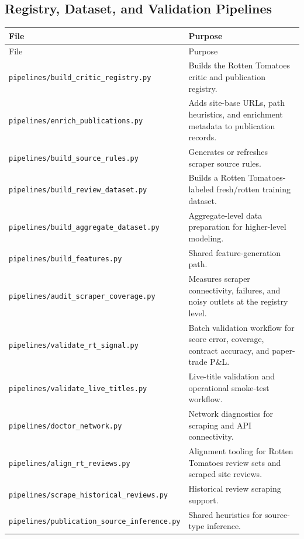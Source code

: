 \documentclass[11pt]{article}
\begin{document}
\subsection{Registry, Dataset, and Validation Pipelines}
\begin{longtable}{>{\ttfamily}p{}p{}}
\toprule
File & Purpose \\
\midrule
\endfirsthead
\toprule
File & Purpose \\
\midrule
\endhead
\textnormal{\texttt{pipelines/build\_critic\_registry.py}} & Builds the Rotten Tomatoes critic and publication registry. \\
\textnormal{\texttt{pipelines/enrich\_publications.py}} & Adds site-base URLs, path heuristics, and enrichment metadata to publication records. \\
\textnormal{\texttt{pipelines/build\_source\_rules.py}} & Generates or refreshes scraper source rules. \\
\textnormal{\texttt{pipelines/build\_review\_dataset.py}} & Builds a Rotten Tomatoes-labeled fresh/rotten training dataset. \\
\textnormal{\texttt{pipelines/build\_aggregate\_dataset.py}} & Aggregate-level data preparation for higher-level modeling. \\
\textnormal{\texttt{pipelines/build\_features.py}} & Shared feature-generation path. \\
\textnormal{\texttt{pipelines/audit\_scraper\_coverage.py}} & Measures scraper connectivity, failures, and noisy outlets at the registry level. \\
\textnormal{\texttt{pipelines/validate\_rt\_signal.py}} & Batch validation workflow for score error, coverage, contract accuracy, and paper-trade P\&L. \\
\textnormal{\texttt{pipelines/validate\_live\_titles.py}} & Live-title validation and operational smoke-test workflow. \\
\textnormal{\texttt{pipelines/doctor\_network.py}} & Network diagnostics for scraping and API connectivity. \\
\textnormal{\texttt{pipelines/align\_rt\_reviews.py}} & Alignment tooling for Rotten Tomatoes review sets and scraped site reviews. \\
\textnormal{\texttt{pipelines/scrape\_historical\_reviews.py}} & Historical review scraping support. \\
\textnormal{\texttt{pipelines/publication\_source\_inference.py}} & Shared heuristics for source-type inference. \\
\bottomrule
\end{longtable}
\end{document}
